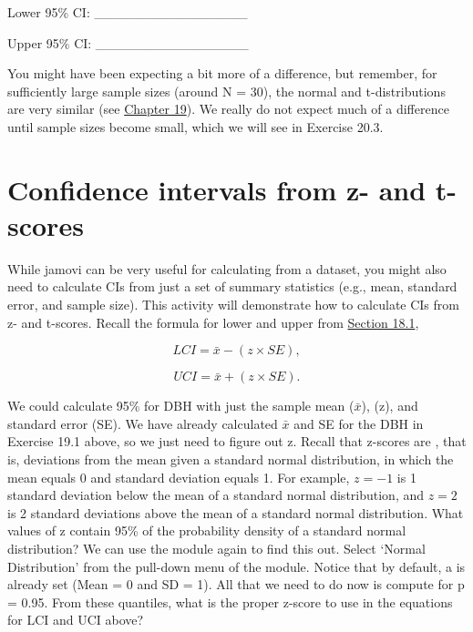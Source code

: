 \documentclass[
  openany]{krantz}
\begin{document}
\newpage

Lower 95\% CI: \_\_\_\_\_\_\_\_\_\_\_\_\_\_\_\_

Upper 95\% CI: \_\_\_\_\_\_\_\_\_\_\_\_\_\_\_\_

You might have been expecting a bit more of a difference, but remember, for sufficiently large sample sizes (around N = 30), the normal and t-distributions are very similar (see \protect\hyperlink{Chapter_19}{Chapter 19}).
We really do not expect much of a difference until sample sizes become small, which we will see in Exercise 20.3.

\hypertarget{confidence-intervals-from-z--and-t-scores}{%
\section{Confidence intervals from z- and t-scores}\label{confidence-intervals-from-z--and-t-scores}}

While jamovi can be very useful for calculating  from a dataset, you might also need to calculate CIs from just a set of summary statistics (e.g., mean, standard error, and sample size).
This activity will demonstrate how to calculate CIs from z- and t-scores.
Recall the formula for lower and upper  from \protect\hyperlink{normal-distribution-cis}{Section 18.1},

\[LCI = \bar{x} - (z \times SE),\]

\[UCI = \bar{x} + (z \times SE).\]

We could calculate 95\%  for DBH with just the sample mean (\(\bar{x}\)),  (z), and standard error (SE).
We have already calculated \(\bar{x}\) and SE for the DBH in Exercise 19.1 above, so we just need to figure out z.
Recall that z-scores are \emph{}, that is, deviations from the mean given a standard normal distribution, in which the mean equals 0 and standard deviation equals 1.
For example, \(z = -1\) is 1 standard deviation below the mean of a standard normal distribution, and \(z = 2\) is 2 standard deviations above the mean of a standard normal distribution.
What values of z contain 95\% of the probability density of a standard normal distribution?
We can use the  module again to find this out.
Select `Normal Distribution' from the pull-down menu of the  module.
Notice that by default, a  is already set (Mean = 0 and SD = 1).
All that we need to do now is compute  for p = 0.95.
From these quantiles, what is the proper z-score to use in the equations for LCI and UCI above?
\end{document}
